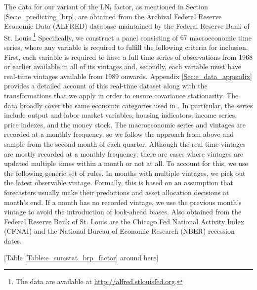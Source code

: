\documentclass[12pt,letterpaper,leqno,doublespacing]{article}
\begin{document}
The data for our variant of the LN$_{t}$ factor, as mentioned in Section \ref{Sec:e_predicting_brp}, are obtained from the Archival Federal Reserve Economic Data (ALFRED) database maintained by the Federal Reserve Bank of St. Louis.\footnote{The data are available at \url{http://alfred.stlouisfed.org}.} Specifically, we construct a panel consisting of $67$ macroeconomic time series, where any variable is required to fulfill the following criteria for inclusion. First, each variable is required to have a full time series of observations from 1968 or earlier available in all of its vintages and, secondly, each variable must have real-time vintages available from 1989 onwards. Appendix \ref{Sec:e_data_appendix} provides a detailed account of this real-time dataset along with the transformations that we apply in order to ensure covariance stationarity. The data broadly cover the same economic categories used in \cite{LudvigsonNg2009}. In particular, the series include output and labor market variables, housing indicators, income series, price indexes, and the money stock. The macroeconomic series and vintages are recorded at a monthly frequency, so we follow the approach from above and sample from the second month of each quarter. Although the real-time vintages are mostly recorded at a monthly frequency, there are cases where vintages are updated multiple times within a month or not at all. To account for this, we use the following generic set of rules. In months with multiple vintages, we pick out the latest observable vintage. Formally, this is based on an assumption that forecasters usually make their predictions and asset allocation decisions at month's end. If a month has no recorded vintage, we use the previous month's vintage to avoid the introduction of look-ahead biases. Also obtained from the Federal Reserve Bank of St. Louis are the Chicago Fed National Activity Index (CFNAI) and the National Bureau of Economic Research (NBER) recession dates.

\begin{center}
    [Table \ref{Table:e_sumstat_brp_factor} around here]
\end{center}
\end{document}
